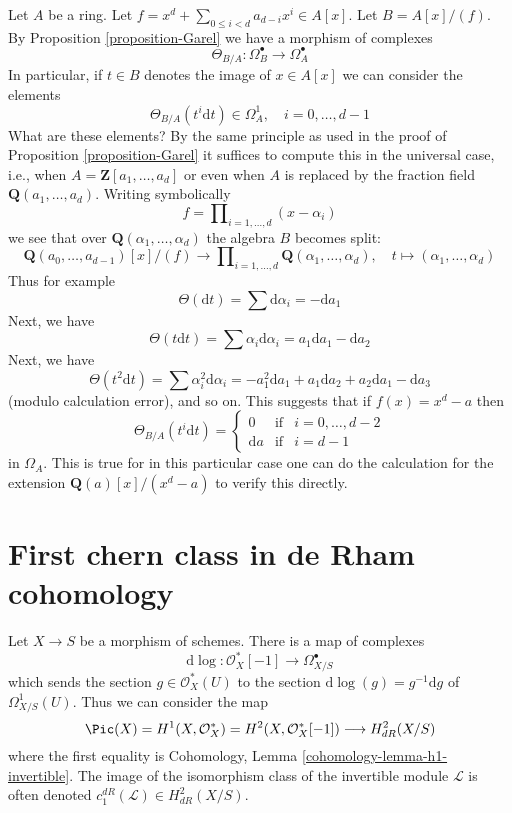 \begin{example}
\label{example-Garel}
Let $A$ be a ring. Let $f = x^d + \sum_{0 \leq i < d} a_{d - i} x^i \in A[x]$.
Let $B = A[x]/(f)$. By Proposition \ref{proposition-Garel}
we have a morphism of complexes
$$
\Theta_{B/A} : \Omega^\bullet_B \longrightarrow \Omega^\bullet_A
$$
In particular, if $t \in B$ denotes the image of $x \in A[x]$
we can consider the elements
$$
\Theta_{B/A}(t^i\text{d}t) \in \Omega^1_A,\quad i = 0, \ldots, d - 1
$$
What are these elements? By the same principle as used in the proof of
Proposition \ref{proposition-Garel} it suffices to compute this
in the universal case, i.e., when $A = \mathbf{Z}[a_1, \ldots, a_d]$
or even when $A$ is replaced by the fraction field
$\mathbf{Q}(a_1, \ldots, a_d)$. Writing symbolically
$$
f = \prod\nolimits_{i = 1, \ldots, d} (x - \alpha_i)
$$
we see that over $\mathbf{Q}(\alpha_1, \ldots, \alpha_d)$
the algebra $B$ becomes split:
$$
\mathbf{Q}(a_0, \ldots, a_{d - 1})[x]/(f) 
\longrightarrow
\prod\nolimits_{i = 1, \ldots, d} \mathbf{Q}(\alpha_1, \ldots, \alpha_d),
\quad
t \longmapsto (\alpha_1, \ldots, \alpha_d)
$$
Thus for example
$$
\Theta(\text{d}t) = \sum \text{d} \alpha_i = - \text{d}a_1
$$
Next, we have
$$
\Theta(t\text{d}t) = \sum \alpha_i \text{d}\alpha_i =
a_1 \text{d} a_1 - \text{d}a_2
$$
Next, we have
$$
\Theta(t^2\text{d}t) = \sum \alpha_i^2 \text{d}\alpha_i =
- a_1^2 \text{d} a_1 + a_1 \text{d}a_2 + a_2 \text{d}a_1 - \text{d}a_3
$$
(modulo calculation error), and so on. This suggests that
if $f(x) = x^d - a$ then
$$
\Theta_{B/A}(t^i\text{d}t) =
\left\{
\begin{matrix}
0 & \text{if} & i = 0, \ldots, d - 2 \\
\text{d}a & \text{if} & i = d - 1
\end{matrix}
\right.
$$
in $\Omega_A$. This is true for in this particular case one can do
the calculation for the extension $\mathbf{Q}(a)[x]/(x^d - a)$
to verify this directly.
\end{example}





\section{First chern class in de Rham cohomology}
\label{section-first-chern-class}

\noindent
Let $X \to S$ be a morphism of schemes. There is a map of complexes
$$
\text{d}\log : \mathcal{O}_X^*[-1] \longrightarrow \Omega^\bullet_{X/S}
$$
which sends the section $g \in \mathcal{O}_X^*(U)$ to the section
$\text{d}\log(g) = g^{-1}\text{d}g$ of $\Omega^1_{X/S}(U)$.
Thus we can consider the map
$$
\Pic(X) = H^1(X, \mathcal{O}_X^*) =
H^2(X, \mathcal{O}_X^*[-1]) \longrightarrow H^2_{dR}(X/S)
$$
where the first equality is
Cohomology, Lemma \ref{cohomology-lemma-h1-invertible}.
The image of the isomorphism class of the invertible module
$\mathcal{L}$ is often denoted $c^{dR}_1(\mathcal{L}) \in H^2_{dR}(X/S)$.

















